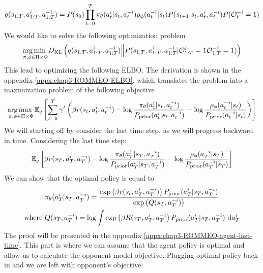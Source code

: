 \begin{equation}
    q(s_{1:T}, a_{1:T}^i, a^{-i}_{1:T}) = P(s_0) \prod^T_{t=0} \pi_{\theta}(a^i_t | s_t, a^{-i}_t) \rho_{\phi}(a^{-i}_t | s_t) P(s_{t+1} | s_t, a^i_t, a^{-i}_t)P(\mathcal{O}^{-i}_t = 1)
\end{equation}
We would like to solve the following optimization problem 
\begin{equation}
    \underset{\pi, \phi \in \Pi \times \Phi}{\arg\min \ }  D_{\mathrm{KL}}\left( q(s_{1:T}, a_{1:T}^i, a^{-i}_{1:T}) \Big\| P(s_{1:T}, a^i_{1:T}, a^{-i}_{1:T}|\mathcal{O}^i_{1:T} = 1  \mathcal{O}^{-i}_{1:T} = 1)  \right)
\end{equation}
This lead to optimizing the following ELBO. The derivation is shown in the appendix \ref{appx:chap3-ROMMEO-ELBO}, which translates the problem into a maximization problem of the following objective
\begin{equation}
\label{eqn:chap3-ROMMEO-ELBO}
    \underset{\pi, \phi \in \Pi \times \Phi}{\arg\max \ } \mathbb{E}_{q}\left[  \sum^T_{t=0} \gamma^t\left( \beta r(s_t, a^i_t, a^{-i}_t)  - \log \frac{\pi_{\theta}(a^i_t | s_t, a^{-i}_t)}{P_{\text{prior}}(a^i_t | s_t, a^{-i}_t) } - \log \frac{\rho_{\phi}(a^{-i}_t | s_t)}{P_{\text{prior}}(a^{-i}_t | s_t)} \right) \right]
\end{equation}
We will starting off by consider the last time step, as we will progress backward in time. Considering the last time step:
\begin{equation}
\label{eqn:training-obj-last-time}
    \mathbb{E}_{q} \left[  \beta r(s_T, a^i_T, a^{-i}_T)  - \log \frac{\pi_{\theta}(a^i_T | s_T, a^{-i}_T)}{P_{\text{prior}}(a^i_T | s_T, a^{-i}_T) } - \log \frac{\rho_{\phi}(a^{-i}_T | s_T)}{P_{\text{prior}}(a^{-i}_T | s_T)} \right]
\end{equation}
We can show that the optimal policy is equal to 
\begin{equation}
\begin{aligned}
    &\pi_{\theta}(a^i_T | s_T, a^{-i}_T) = \frac{\exp \left( \beta r(s_t, a^i_T, a^{-i}_T) \right)P_{\text{prior}}(a^i_T | s_T, a^{-i}_T)}{\exp\left( Q(s_T, a^{-i}_T) \right)} \\
    \text{where }& Q(s_T, a^{-i}_T) = \log \int \exp \left( \beta R(s_T, a^i_T, a^{-i}_T \right)P_{\text{prior}}(a^i_T | s_T, a^{-i}_T)  \ \mathrm{d} a^i_T
\end{aligned}
\end{equation}
The proof will be presented in the appendix \ref{appx:chap3-ROMMEO-agent-last-time}. This part is where we can assume that the agent policy is optimal and allow us to calculate the opponent model objective. Plugging optimal policy back in and we are left with opponent's objective:
